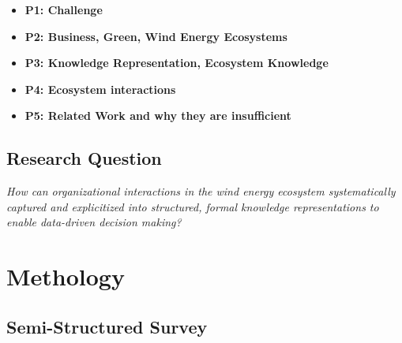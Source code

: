 \documentclass[runningheads]{llncs}
\begin{document}
\begin{itemize}
    \item \textbf{P1: Challenge}
    \item \textbf{P2: Business, Green, Wind Energy Ecosystems}
    \item \textbf{P3: Knowledge Representation, Ecosystem Knowledge}
    \item \textbf{P4: Ecosystem interactions}
    \item \textbf{P5: Related Work and why they are insufficient}
\end{itemize}

\subsection*{\textbf{Research Question}}
\begin{center}
    \textit{How can organizational interactions in the wind energy ecosystem 
systematically captured and explicitized into structured, formal knowledge representations to enable data-driven decision making?}
\end{center}

\section{Methology}

\subsection{Semi-Structured Survey}
\end{document}
